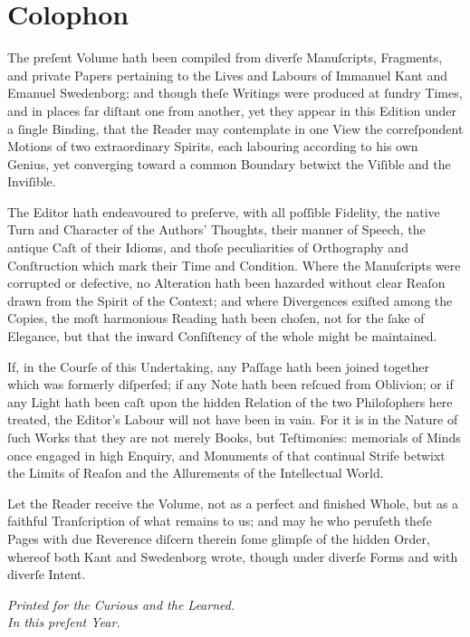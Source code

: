 \documentclass[12pt]{article}
\begin{document}
\newpage

\section*{Colophon}

The preſent Volume hath been compiled from diverſe Manuſcripts, 
Fragments, and private Papers pertaining to the Lives and Labours of 
Immanuel Kant and Emanuel Swedenborg; and though theſe Writings were 
produced at ſundry Times, and in places far diſtant one from another, yet 
they appear in this Edition under a ſingle Binding, that the Reader may 
contemplate in one View the correſpondent Motions of two extraordinary 
Spirits, each labouring according to his own Genius, yet converging toward 
a common Boundary betwixt the Viſible and the Inviſible.

The Editor hath endeavoured to preſerve, with all poſſible Fidelity, the 
native Turn and Character of the Authors’ Thoughts, their manner of 
Speech, the antique Caſt of their Idioms, and thoſe peculiarities of 
Orthography and Conſtruction which mark their Time and Condition. Where 
the Manuſcripts were corrupted or defective, no Alteration hath been 
hazarded without clear Reaſon drawn from the Spirit of the Context; and 
where Divergences exiſted among the Copies, the moſt harmonious Reading 
hath been choſen, not for the ſake of Elegance, but that the inward 
Conſiſtency of the whole might be maintained.

If, in the Courſe of this Undertaking, any Paſſage hath been joined 
together which was formerly diſperſed; if any Note hath been reſcued from 
Oblivion; or if any Light hath been caſt upon the hidden Relation of the 
two Philoſophers here treated, the Editor’s Labour will not have been in 
vain. For it is in the Nature of ſuch Works that they are not merely Books, 
but Teſtimonies: memorials of Minds once engaged in high Enquiry, and 
Monuments of that continual Strife betwixt the Limits of Reaſon and the 
Allurements of the Intellectual World.

Let the Reader receive the Volume, not as a perfect and finished Whole, but 
as a faithful Tranſcription of what remains to us; and may he who peruſeth 
theſe Pages with due Reverence diſcern therein ſome glimpſe of the hidden 
Order, whereof both Kant and Swedenborg wrote, though under diverſe Forms 
and with diverſe Intent.

\begin{flushright}
\textit{Printed for the Curious and the Learned.}\\
\textit{In this preſent Year.}
\end{flushright}
\end{document}
